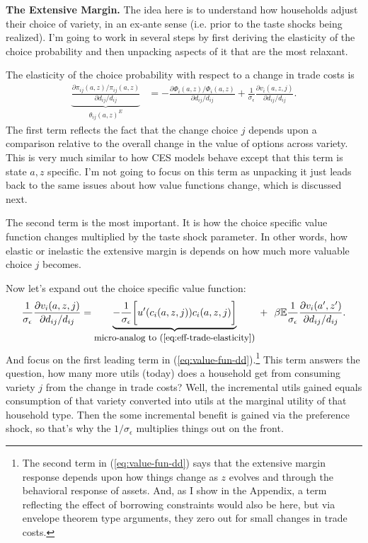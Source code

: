\documentclass[12pt,pdftex]{article}
\begin{document}
\begin{onehalfspacing}
\textbf{The Extensive Margin.} The idea here is to understand how households adjust their choice of variety, in an ex-ante sense (i.e. prior to the taste shocks being realized). I'm going to work in several steps by first deriving the elasticity of the choice probability and then unpacking aspects of it that are the most relaxant.

The elasticity of the choice probability with respect to a change in trade costs is
\begin{align}
\underbrace{ \frac{\partial \pi_{ij}(a,z) / \pi_{ij}(a,z)}{\partial d_{ij} / d_{ij}} }_{\theta_{ij}(a,z)^{E}} &= -\frac{\partial \Phi_{i}(a,z) / \Phi_{i}(a,z)}{\partial d_{ij}/d_{ij}} + \frac{1}{\sigma_{\epsilon}}\frac{\partial v_{i}(a,z,j)}{\partial d_{ij}/d_{ij}} .
\label{eq:extensive-margin}
\end{align}
The first term reflects the fact that the change choice $j$ depends upon a comparison relative to the overall change in the value of options across variety. This is very much similar to how CES models behave except that this term is state $a,z$ specific. I'm not going to focus on this term as unpacking it just leads back to the same issues about how value functions change, which is discussed next.

The second term is the most important. It is how the choice specific value function changes multiplied by the taste shock parameter. In other words, how elastic or inelastic the extensive margin is depends on how much more valuable choice $j$ becomes.



Now let's expand out the choice specific value function:
\begin{align}
\frac{1}{\sigma_{\epsilon}}\frac{\partial v_{i}(a,z,j)}{\partial d_{ij}/d_{ij}} = \underbrace{-\frac{1}{\sigma_{\epsilon}}\bigg[u'(c_{i}(a,z,j))c_{i}(a,z,j)\bigg]}_{\mbox{\small micro-analog to (\ref{eq:eff-trade-elasticity})}} \
+ \ \ \beta \mathbb{E}\frac{1}{\sigma_{\epsilon}}\frac{\partial v_{i}(a',z')}{\partial d_{ij}/ d_{ij}}. \label{eq:value-fun-dd}
\end{align}
And focus on the first leading term in (\ref{eq:value-fun-dd}).\footnote{The second term in (\ref{eq:value-fun-dd}) says that the extensive margin response depends upon how things change as $z$ evolves and through the behavioral response of assets. And, as I show in the Appendix, a term reflecting the effect of borrowing constraints would also be here, but via envelope theorem type arguments, they zero out for small changes in trade costs.} This term answers the question, how many more utils (today) does a household get from consuming variety $j$ from the change in trade costs? Well, the incremental utils gained equals consumption of that variety converted into utils at the marginal utility of that household type. Then the some incremental benefit is gained via the preference shock, so that's why the $1 / \sigma_{\epsilon}$ multiplies things out on the front.


\end{onehalfspacing}
\end{document}
